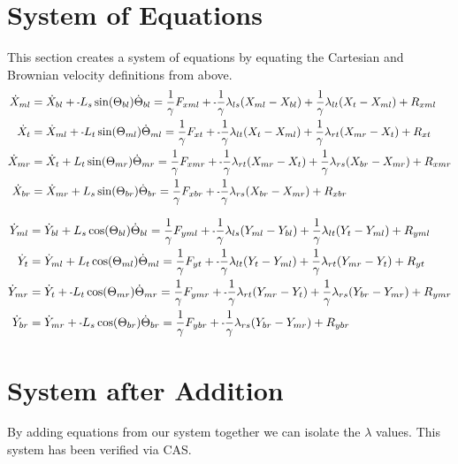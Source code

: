 \documentclass[11pt, landscape]{article}
\newcommand{\mn}{\scalebox{0.7}[1.0]{-}}
\begin{document}
\section{System of Equations}
This section creates a system of equations by equating the Cartesian and Brownian velocity definitions from above. \\

\begin{align}  
  \dot{X}_{ml} &= \dot{X}_{bl} + \mn L_{s}\sin(\Theta_{bl})\dot{\Theta}_{bl} = \frac{1}{\gamma}F_{xml} + \mn\frac{1}{\gamma}\lambda_{ls}(X_{ml} - X_{bl}) + \frac{1}{\gamma}\lambda_{lt}(X_{t } - X_{ml}) + R_{xml} \\
  \dot{X}_{t}  &= \dot{X}_{ml} + \mn L_{t}\sin(\Theta_{ml})\dot{\Theta}_{ml} = \frac{1}{\gamma}F_{xt } + \mn\frac{1}{\gamma}\lambda_{lt}(X_{t } - X_{ml}) + \frac{1}{\gamma}\lambda_{rt}(X_{mr} - X_{t }) + R_{xt } \\
  \dot{X}_{mr} &= \dot{X}_{t } + L_{t}\sin(\Theta_{mr})\dot{\Theta}_{mr} = \frac{1}{\gamma}F_{xmr} + \mn\frac{1}{\gamma}\lambda_{rt}(X_{mr} - X_{t }) + \frac{1}{\gamma}\lambda_{rs}(X_{br} - X_{mr}) + R_{xmr} \\
  \dot{X}_{br} &= \dot{X}_{mr} + L_{s}\sin(\Theta_{br})\dot{\Theta}_{br} = \frac{1}{\gamma}F_{xbr} + \mn\frac{1}{\gamma}\lambda_{rs}(X_{br} - X_{mr}) + R_{xbr}
\end{align}

\begin{align}  
  \dot{Y}_{ml} &= \dot{Y}_{bl} + L_{s}\cos(\Theta_{bl})\dot{\Theta}_{bl} = \frac{1}{\gamma}F_{yml} + \mn\frac{1}{\gamma}\lambda_{ls}(Y_{ml} - Y_{bl}) + \frac{1}{\gamma}\lambda_{lt}(Y_{t } - Y_{ml}) + R_{yml} \\
  \dot{Y}_{t}  &= \dot{Y}_{ml} + L_{t}\cos(\Theta_{ml})\dot{\Theta}_{ml} = \frac{1}{\gamma}F_{yt } + \mn\frac{1}{\gamma}\lambda_{lt}(Y_{t } - Y_{ml}) + \frac{1}{\gamma}\lambda_{rt}(Y_{mr} - Y_{t }) + R_{yt } \\
  \dot{Y}_{mr} &= \dot{Y}_{t } + \mn L_{t}\cos(\Theta_{mr})\dot{\Theta}_{mr} = \frac{1}{\gamma}F_{ymr} + \mn\frac{1}{\gamma}\lambda_{rt}(Y_{mr} - Y_{t }) + \frac{1}{\gamma}\lambda_{rs}(Y_{br} - Y_{mr}) + R_{ymr} \\
  \dot{Y}_{br} &= \dot{Y}_{mr} + \mn L_{s}\cos(\Theta_{br})\dot{\Theta}_{br} = \frac{1}{\gamma}F_{ybr} + \mn\frac{1}{\gamma}\lambda_{rs}(Y_{br} - Y_{mr}) + R_{ybr}
\end{align}

\section{System after Addition}
By adding equations from our system together we can isolate the $\lambda$ values. This system has been verified via CAS.\\
\end{document}
